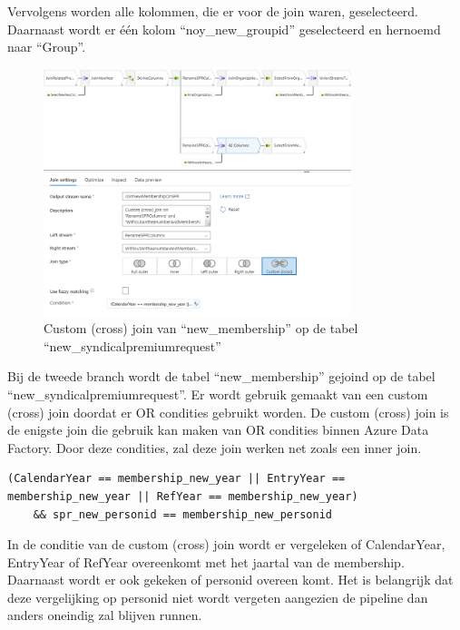 Vervolgens worden alle kolommen, die er voor de join waren, geselecteerd. Daarnaast wordt er één kolom ``noy\_new\_groupid'' geselecteerd en hernoemd naar ``Group''.

\begin{figure}[H]
    \centering
    \includegraphics[width=0.8\textwidth]{./graphics/adf/bepalen_groep_6.png}
    \caption{Custom (cross) join van ``new\_membership'' op de tabel ``new\_syndicalpremiumrequest''}
\end{figure}

Bij de tweede branch wordt de tabel ``new\_membership'' gejoind op de tabel ``new\_syndicalpremiumrequest''. Er wordt gebruik gemaakt van een custom (cross) join doordat er OR condities gebruikt worden. De custom (cross) join is de enigste join die gebruik kan maken van OR condities binnen Azure Data Factory. Door deze condities, zal deze join werken net zoals een inner join. 

\begin{lstlisting}[language={}, caption={Conditie van custom (cross) join op de tabel ``new\_syndicalpremiumrequest''.}, style=myStyle]
(CalendarYear == membership_new_year || EntryYear == membership_new_year || RefYear == membership_new_year) 
    && spr_new_personid == membership_new_personid
\end{lstlisting}

In de conditie van de custom (cross) join wordt er vergeleken of CalendarYear, EntryYear of RefYear overeenkomt met het jaartal van de membership. Daarnaast wordt er ook gekeken of personid overeen komt. Het is belangrijk dat deze vergelijking op personid niet wordt vergeten aangezien de pipeline dan anders oneindig zal blijven runnen. 

